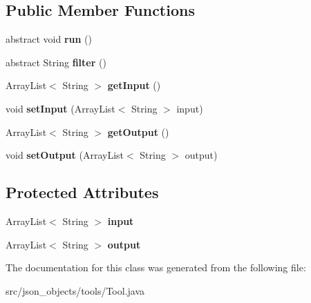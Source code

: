 \subsection*{Public Member Functions}
\begin{DoxyCompactItemize}
\item 
\hypertarget{classjson__objects_1_1tools_1_1_tool_a80fc57096b50878d51ee6756bca2f61b}{
abstract void {\bfseries run} ()}
\label{classjson__objects_1_1tools_1_1_tool_a80fc57096b50878d51ee6756bca2f61b}

\item 
\hypertarget{classjson__objects_1_1tools_1_1_tool_af509e9e418088b2bf33e1b9696b009a2}{
abstract String {\bfseries filter} ()}
\label{classjson__objects_1_1tools_1_1_tool_af509e9e418088b2bf33e1b9696b009a2}

\item 
\hypertarget{classjson__objects_1_1tools_1_1_tool_acfa04da5a94d870feba5a189cec44370}{
ArrayList$<$ String $>$ {\bfseries getInput} ()}
\label{classjson__objects_1_1tools_1_1_tool_acfa04da5a94d870feba5a189cec44370}

\item 
\hypertarget{classjson__objects_1_1tools_1_1_tool_a876c434149908b8a7860078f8d737e2d}{
void {\bfseries setInput} (ArrayList$<$ String $>$ input)}
\label{classjson__objects_1_1tools_1_1_tool_a876c434149908b8a7860078f8d737e2d}

\item 
\hypertarget{classjson__objects_1_1tools_1_1_tool_a52184588ebdb2b3b08499c67d7fba266}{
ArrayList$<$ String $>$ {\bfseries getOutput} ()}
\label{classjson__objects_1_1tools_1_1_tool_a52184588ebdb2b3b08499c67d7fba266}

\item 
\hypertarget{classjson__objects_1_1tools_1_1_tool_a795e107096bb1200702145595d8858c7}{
void {\bfseries setOutput} (ArrayList$<$ String $>$ output)}
\label{classjson__objects_1_1tools_1_1_tool_a795e107096bb1200702145595d8858c7}

\end{DoxyCompactItemize}
\subsection*{Protected Attributes}
\begin{DoxyCompactItemize}
\item 
\hypertarget{classjson__objects_1_1tools_1_1_tool_a8238cbae28739d3eaeca8206c6ba0f27}{
ArrayList$<$ String $>$ {\bfseries input}}
\label{classjson__objects_1_1tools_1_1_tool_a8238cbae28739d3eaeca8206c6ba0f27}

\item 
\hypertarget{classjson__objects_1_1tools_1_1_tool_aa2dabf8d668a94b74925fc9e4fa2a0fe}{
ArrayList$<$ String $>$ {\bfseries output}}
\label{classjson__objects_1_1tools_1_1_tool_aa2dabf8d668a94b74925fc9e4fa2a0fe}

\end{DoxyCompactItemize}


The documentation for this class was generated from the following file:\begin{DoxyCompactItemize}
\item 
src/json\_\-objects/tools/Tool.java\end{DoxyCompactItemize}
